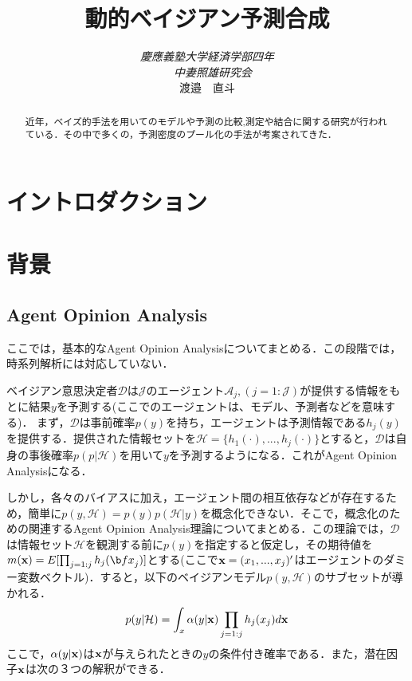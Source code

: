\documentclass[11pt,a4paper]{article}
\title{動的ベイジアン予測合成}
\author{\emph{慶應義塾大学経済学部四年}\\　\emph{中妻照雄研究会} \\渡邉　直斗  }
\date{}
\begin{document}
\maketitle

\begin{abstract}
近年，ベイズ的手法を用いてのモデルや予測の比較,測定や結合に関する研究が行われている．その中で多くの，予測密度のプール化の手法が考案されてきた．
\end{abstract}

\clearpage
\setcounter{tocdepth}{1}
\tableofcontents
\clearpage
\newtheorem{theo}{定理}[section]
\newtheorem{defi}[theo]{定義}
\newtheorem{lemm}[theo]{補題}
\newtheorem{Proof}{証明}

\section{イントロダクション}


\section{背景}
\subsection{Agent Opinion Analysis}
ここでは，基本的なAgent Opinion Analysisについてまとめる．この段階では，時系列解析には対応していない．\par
ベイジアン意思決定者$\mathcal{D}$は$\mathcal{J}$のエージェント$\mathcal{A}_j,(j = 1:\mathcal{J})$が提供する情報をもとに結果$y$を予測する(ここでのエージェントは、モデル、予測者などを意味する)．
まず，$\mathcal{D}$は事前確率$p(y)$を持ち，エージェントは予測情報である$h_j(y)$を提供する．提供された情報セットを$\mathcal{H} = \{h_1(\cdot),...,h_j(\cdot)\}$とすると，$\mathcal{D}$は自身の事後確率$p(p|\mathcal{H})$を用いて$y$を予測するようになる．これがAgent Opinion Analysisになる．\par
しかし，各々のバイアスに加え，エージェント間の相互依存などが存在するため，簡単に$p(y,\mathcal{H})=p(y)p(\mathcal{H}|y)$を概念化できない．そこで，概念化のための関連するAgent Opinion Analysis理論についてまとめる．この理論では，$\mathcal{D}$は情報セット$\mathcal{H}$を観測する前に$p(y)$を指定すると仮定し，その期待値を$m({\bf x}) = E[\prod_{j=1:j}h_j({\b fx}_j)]$とする(ここで$\bold{x} = (x_1,...,x_j)'$はエージェントのダミー変数ベクトル)．すると，以下のベイジアンモデル$p(y,\mathcal{H})$のサブセットが導かれる．
\[
p(y|\mathcal{H}) = \int_x \alpha(y|{\bf x}) \prod_{j=1:j} h_j(x_j)d\bf x
\]
ここで，$\alpha (y|\bf x)$は$\bf x$が与えられたときの$y$の条件付き確率である．また，潜在因子$\bf x$は次の３つの解釈ができる．
\end{document}
